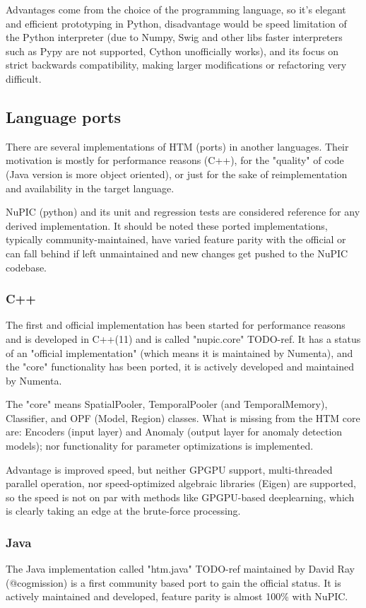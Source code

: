 \documentclass[a4,IEEEconf]{article}
\begin{document}
Advantages come from the choice of the programming language, so it's elegant and efficient prototyping in Python, disadvantage would be speed limitation of the Python interpreter (due to Numpy, Swig and other libs faster interpreters such as Pypy are not supported, Cython unofficially works), and its focus on strict backwards compatibility, making larger modifications or refactoring very difficult. 

\subsection{Language ports}
There are several implementations of HTM (ports) in another languages. Their motivation is mostly for performance reasons (C++), for the "quality" of code (Java version is more object oriented), or just for the sake of reimplementation and availability in the target language. 

NuPIC (python) and its unit and regression tests are considered reference for any derived implementation. It should be noted these ported implementations, typically community-maintained, have varied feature parity with the official or can fall behind if left unmaintained and new changes get pushed to the NuPIC codebase. 

\subsubsection{C++}
The first and official implementation has been started for performance reasons and is developed in C++(11) and is called "nupic.core" TODO-ref. It has a status of an "official implementation" (which means it is maintained by Numenta), and the "core" functionality has been ported, it is actively developed and maintained by Numenta. 

The "core" means SpatialPooler, TemporalPooler (and TemporalMemory), Classifier, and OPF (Model, Region) classes.
What is missing from the HTM core are: Encoders (input layer) and Anomaly (output layer for anomaly detection models); nor functionality for parameter optimizations is implemented.  

Advantage is improved speed, but neither GPGPU support, multi-threaded parallel operation, nor speed-optimized algebraic libraries (Eigen) are supported, so the speed is not on par with methods like GPGPU-based deeplearning, which is clearly taking an edge at the brute-force processing. 

\subsubsection{Java}
The Java implementation called "htm.java" TODO-ref maintained by David Ray (@cogmission) is a first community based port to gain the official status. It is actively maintained and developed, feature parity is almost 100\% with NuPIC. 
\end{document}
